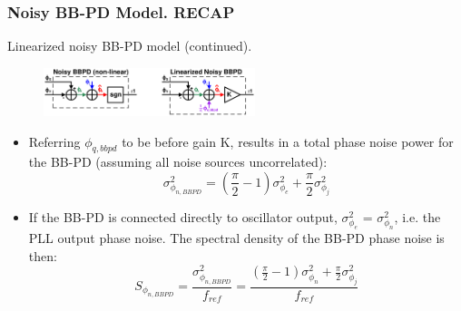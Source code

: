 \documentclass[t, screen, aspectratio=43]{beamer}
\begin{document}
\begin{frame}
	\frametitle{Noisy BB-PD Model. \color{red}RECAP}
	\begin{block}{Linearized noisy BB-PD model (continued).}
	\tiny
	\begin{figure}[htb!]
	    \centering
		\includegraphics[width=0.55\textwidth, angle=0]{bbpd_noise_linearized.pdf}
	\end{figure}
	\begin{itemize}[itemsep=4pt,label=\protect---]
		\item Referring $\phi_{q,bbpd}$ to be before gain K, results in a total phase noise power for the BB-PD (assuming all noise sources uncorrelated):
		\tiny
		\begin{equation}
			\sigma^2_{\phi_{n,BBPD}} =   \left(\frac{\pi}{2}-1\right)\sigma^2_{\phi_e} + \frac{\pi}{2}\sigma^2_{\phi_j}
		\end{equation}
		\item If the BB-PD is connected directly to oscillator output, $\sigma^2_{\phi_e}$ = $\sigma^2_{\phi_n}$, i.e. the PLL output phase noise. The spectral density of the BB-PD phase noise is then:
		\begin{equation}
			S_{\phi_{n,BBPD}} = \frac{\sigma^2_{\phi_{n,BBPD}}}{f_{ref}} =  \frac{\left(\frac{\pi}{2}-1\right)\sigma^2_{\phi_n} + \frac{\pi}{2}\sigma^2_{\phi_j}}{f_{ref}}
		\end{equation}
	\end{itemize}

	\end{block}	
\end{frame}
\end{document}
